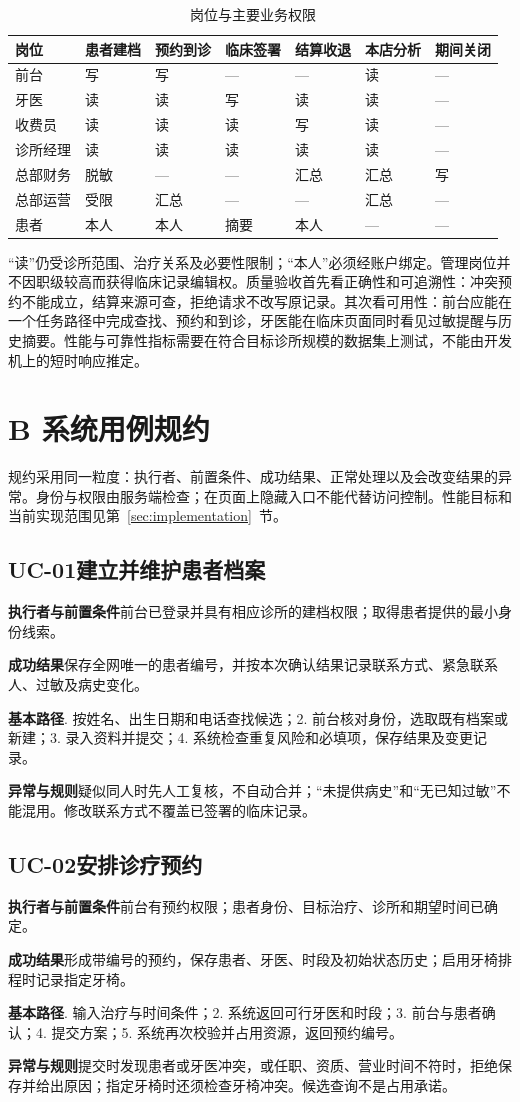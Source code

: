 \documentclass[12pt,a4paper,fontset=windows]{ctexart}
\newcommand{\spec}[6]{\Needspace{10\baselineskip}\subsection{#1\quad #2}
  \noindent\textbf{执行者与前置条件}\quad #3\par
  \noindent\textbf{成功结果}\quad #4\par
  \noindent\textbf{基本路径}\quad #5\par
  \noindent\textbf{异常与规则}\quad #6\par}
\begin{document}
\begin{table}[!htbp]\centering\small
\caption{岗位与主要业务权限}\label{tab:permissions}
\begin{tabular}{@{}L{24mm}C{17mm}C{17mm}C{17mm}C{17mm}C{17mm}C{17mm}@{}}\toprule
岗位 & 患者建档 & 预约到诊 & 临床签署 & 结算收退 & 本店分析 & 期间关闭\\\midrule
前台 & 写 & 写 & — & — & 读 & —\\
牙医 & 读 & 读 & 写 & 读 & 读 & —\\
收费员 & 读 & 读 & 读 & 写 & 读 & —\\
诊所经理 & 读 & 读 & 读 & 读 & 读 & —\\
总部财务 & 脱敏 & — & — & 汇总 & 汇总 & 写\\
总部运营 & 受限 & 汇总 & — & — & 汇总 & —\\
患者 & 本人 & 本人 & 摘要 & 本人 & — & —\\
\bottomrule\end{tabular}\end{table}

“读”仍受诊所范围、治疗关系及必要性限制；“本人”必须经账户绑定。管理岗位并不因职级较高而获得临床记录编辑权。质量验收首先看正确性和可追溯性：冲突预约不能成立，结算来源可查，拒绝请求不改写原记录。其次看可用性：前台应能在一个任务路径中完成查找、预约和到诊，牙医能在临床页面同时看见过敏提醒与历史摘要。性能与可靠性指标需要在符合目标诊所规模的数据集上测试，不能由开发机上的短时响应推定。

\section{B 系统用例规约}
规约采用同一粒度：执行者、前置条件、成功结果、正常处理以及会改变结果的异常。身份与权限由服务端检查；在页面上隐藏入口不能代替访问控制。性能目标和当前实现范围见第~\ref{sec:implementation}~节。

\spec{UC-01}{建立并维护患者档案}
{前台已登录并具有相应诊所的建档权限；取得患者提供的最小身份线索。}
{保存全网唯一的患者编号，并按本次确认结果记录联系方式、紧急联系人、过敏及病史变化。}
{1. 按姓名、出生日期和电话查找候选；2. 前台核对身份，选取既有档案或新建；3. 录入资料并提交；4. 系统检查重复风险和必填项，保存结果及变更记录。}
{疑似同人时先人工复核，不自动合并；“未提供病史”和“无已知过敏”不能混用。修改联系方式不覆盖已签署的临床记录。}

\spec{UC-02}{安排诊疗预约}
{前台有预约权限；患者身份、目标治疗、诊所和期望时间已确定。}
{形成带编号的预约，保存患者、牙医、时段及初始状态历史；启用牙椅排程时记录指定牙椅。}
{1. 输入治疗与时间条件；2. 系统返回可行牙医和时段；3. 前台与患者确认；4. 提交方案；5. 系统再次校验并占用资源，返回预约编号。}
{提交时发现患者或牙医冲突，或任职、资质、营业时间不符时，拒绝保存并给出原因；指定牙椅时还须检查牙椅冲突。候选查询不是占用承诺。}
\end{document}

